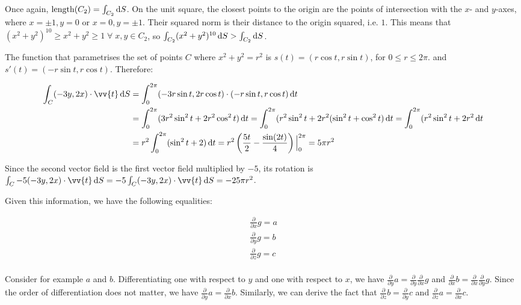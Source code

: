 Once again, $\text{length}(C_2) = \int_{C_2} \mathop{}\!\mathrm{d} S$. On the unit square, the closest points to the origin are the points of intersection with the $x$- and $y$-axes, where $x = \pm 1, y = 0$ or $x = 0, y = \pm 1$. Their squared norm is their distance to the origin squared, i.e. $1$. This means that $(x^2 + y^2)^{10} \geq x^2 + y^2 \geq 1 \;\forall\; x, y \in C_2$, so $\int_{C_2} (x^2 + y^2)^{10} \mathop{}\!\mathrm{d} S > \int_{C_2} \mathop{}\!\mathrm{d} S$.

The function that parametrises the set of points $C$ where $x^2 + y^2 = r^2$ is $s(t) = (r\cos t, r\sin t)$, for $0 \leq r \leq 2\pi$. and $s'(t) = (-r\sin t, r\cos t)$. Therefore:

\begin{align*}
  \int_C (-3y, 2x) \cdot \vv{t} \diff S &= \int_0^{2\pi} (-3r\sin t, 2r\cos t) \cdot (-r\sin t, r\cos t) \diff t \\
  &= \int_0^{2\pi} (3r^2 \sin^2 t + 2r^2 \cos^2 t) \diff t = \int_0^{2\pi} (r^2 \sin^2 t + 2r^2 (\sin^2 t + \cos^2 t) \diff t = \int_0^{2\pi} (r^2 \sin^2 t + 2r^2 \diff t \\
  &= r^2 \int_0^{2\pi} (\sin^2 t + 2) \diff t = r^2\left(\frac{5t}{2} - \frac{\sin(2t)}{4}\right)\Big|_0^{2\pi} = 5\pi r^2
\end{align*}

Since the second vector field is the first vector field multiplied by $-5$, its rotation is $\int_C -5(-3y, 2x) \cdot \vv{t} \diff S = -5\int_C (-3y, 2x) \cdot \vv{t} \diff S = -25\pi r^2$.


Given this information, we have the following equalities:

\begin{align*}
  \frac{\partial}{\partial x} g = a \\
  \frac{\partial}{\partial y} g = b \\
  \frac{\partial}{\partial z} g = c \\
\end{align*}

Consider for example $a$ and $b$. Differentiating one with respect to $y$ and one with respect to $x$, we have $\frac{\partial}{\partial y} a = \frac{\partial}{\partial y}\frac{\partial}{\partial x} g$ and $\frac{\partial}{\partial x} b = \frac{\partial}{\partial x}\frac{\partial}{\partial y} g$. Since the order of differentiation does not matter, we have $\frac{\partial}{\partial y} a = \frac{\partial}{\partial x} b$. Similarly, we can derive the fact that $\frac{\partial}{\partial z} b = \frac{\partial}{\partial y} c$ and $\frac{\partial}{\partial z} a = \frac{\partial}{\partial x} c$.

